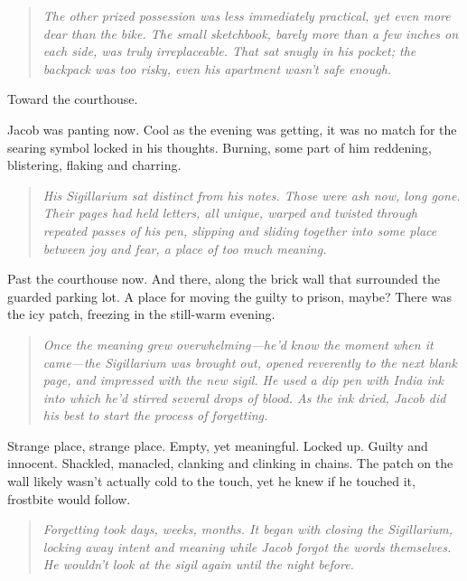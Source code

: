 \begin{paracol}{2}
\begin{rightcolumn}
    \begin{quote}
    \emph{The other prized possession was less immediately practical, yet even more dear than the bike. The small sketchbook, barely more than a few inches on each side, was truly irreplaceable. That sat snugly in his pocket; the backpack was too risky, even his apartment wasn't safe enough.}
    \end{quote}

    Toward the courthouse.

    Jacob was panting now. Cool as the evening was getting, it was no match for the searing symbol locked in his thoughts. Burning, some part of him reddening, blistering, flaking and charring.

    \begin{quote}
    \emph{His Sigillarium sat distinct from his notes. Those were ash now, long gone. Their pages had held letters, all unique, warped and twisted through repeated passes of his pen, slipping and sliding together into some place between joy and fear, a place of too much meaning.}
    \end{quote}

    Past the courthouse now. And there, along the brick wall that surrounded the guarded parking lot. A place for moving the guilty to prison, maybe? There was the icy patch, freezing in the still-warm evening.

    \begin{quote}
    \emph{Once the meaning grew overwhelming---he'd know the moment when it came---the Sigillarium was brought out, opened reverently to the next blank page, and impressed with the new sigil. He used a dip pen with India ink into which he'd stirred several drops of blood. As the ink dried, Jacob did his best to start the process of forgetting.}
    \end{quote}

    Strange place, strange place. Empty, yet meaningful. Locked up. Guilty and innocent. Shackled, manacled, clanking and clinking in chains. The patch on the wall likely wasn't actually cold to the touch, yet he knew if he touched it, frostbite would follow.

    \begin{quote}
    \emph{Forgetting took days, weeks, months. It began with closing the Sigillarium, locking away intent and meaning while Jacob forgot the words themselves. He wouldn't look at the sigil again until the night before.}
    \end{quote}


\end{rightcolumn}
\end{paracol}
